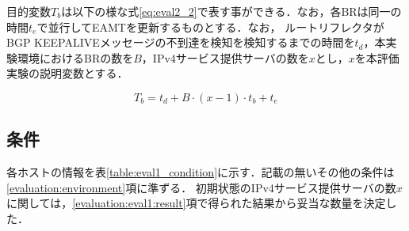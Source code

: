 目的変数$T_b$は以下の様な式\ref{eq:eval2_2}で表す事ができる．なお，各BRは同一の時間$t_e$で並行してEAMTを更新するものとする．なお，
ルートリフレクタがBGP KEEPALIVEメッセージの不到達を検知を検知するまでの時間を$t_d$，本実験環境におけるBRの数を$B$，IPv4サービス提供サーバの数を$x$とし，$x$を本評価実験の説明変数とする．

\begin{equation}
    T_b = t_d + B \cdot (x-1) \cdot t_b  + t_e
    \label{eq:eval2_2}
\end{equation}



\subsection{条件}
各ホストの情報を表\ref{table:eval1_condition}に示す．記載の無いその他の条件は\ref{evaluation:environment}項に準ずる．
初期状態のIPv4サービス提供サーバの数$x$に関しては，\ref{evaluation:eval1:result}項で得られた結果から妥当な数量を決定した．

\begin{table}[h]
    \label{table:eval2_condition}
    \caption{評価実験2での各ホストの情報}
\end{table}

